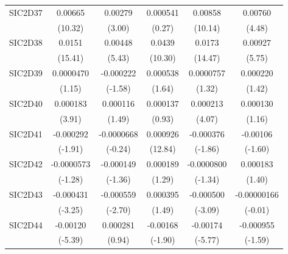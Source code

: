 \begin{table}[htbp]
\begin{tabular}{l*{5}{c}}
SIC2D37     &     0.00665\sym{***}&     0.00279\sym{**} &    0.000541         &     0.00858\sym{***}&     0.00760\sym{***}\\
            &     (10.32)         &      (3.00)         &      (0.27)         &     (10.14)         &      (4.48)         \\
SIC2D38     &      0.0151\sym{***}&     0.00448\sym{***}&      0.0439\sym{***}&      0.0173\sym{***}&     0.00927\sym{***}\\
            &     (15.41)         &      (5.43)         &     (10.30)         &     (14.47)         &      (5.75)         \\
SIC2D39     &   0.0000470         &   -0.000222         &    0.000538         &   0.0000757         &    0.000220         \\
            &      (1.15)         &     (-1.58)         &      (1.64)         &      (1.32)         &      (1.42)         \\
SIC2D40     &    0.000183\sym{***}&    0.000116         &    0.000137         &    0.000213\sym{***}&    0.000130         \\
            &      (3.91)         &      (1.49)         &      (0.93)         &      (4.07)         &      (1.16)         \\
SIC2D41     &   -0.000292         &  -0.0000668         &    0.000926\sym{***}&   -0.000376         &    -0.00106         \\
            &     (-1.91)         &     (-0.24)         &     (12.84)         &     (-1.86)         &     (-1.60)         \\
SIC2D42     &  -0.0000573         &   -0.000149         &    0.000189         &  -0.0000800         &    0.000183         \\
            &     (-1.28)         &     (-1.36)         &      (1.29)         &     (-1.34)         &      (1.40)         \\
SIC2D43     &   -0.000431\sym{**} &   -0.000559\sym{**} &    0.000395         &   -0.000500\sym{**} & -0.00000166         \\
            &     (-3.25)         &     (-2.70)         &      (1.49)         &     (-3.09)         &     (-0.01)         \\
SIC2D44     &    -0.00120\sym{***}&    0.000281         &    -0.00168         &    -0.00174\sym{***}&   -0.000955         \\
            &     (-5.39)         &      (0.94)         &     (-1.90)         &     (-5.77)         &     (-1.59)         \\

\end{tabular}
\end{table}
